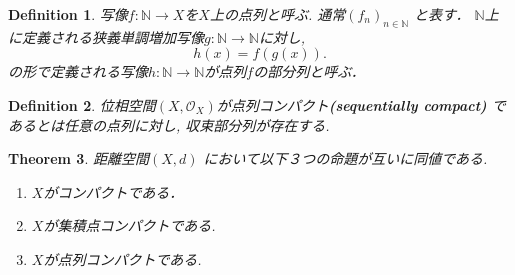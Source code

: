 \documentclass[lualatex]{ltjsbook}
\newtheorem{theorem}{Theorem}[chapter]
\newtheorem{definition}[theorem]{Definition}
\theoremstyle{remark}
\theoremstyle{plain}
\begin{document}
\begin{definition}
	 写像$f: \mathbb{N} \to X$を$X$上の点列と呼ぶ. 
	 通常$(f_n)_{n \in \mathbb{N}}$ と表す．
	 $\mathbb{N}$上に定義される狭義単調増加写像$g: \mathbb{N} \to  \mathbb{N}$に対し,  
	 \[
	 h(x) = f(g(x))
	 .\] 
	 の形で定義される写像$h: \mathbb{N} \to \mathbb{N}$が点列$f$の部分列と呼ぶ．
\end{definition}

\begin{definition}
	位相空間$\left( X ,  \mathcal{O}_{X} \right)$が点列コンパクト\textbf{(sequentially compact)}
	であるとは任意の点列に対し,  収束部分列が存在する.
\end{definition}

\begin{theorem}
	距離空間$\left( X , d \right)$ において以下３つの命題が互いに同値である.
	\begin{enumerate}
		\item $X$がコンパクトである．
		\item  $X$が集積点コンパクトである.
		\item $X$が点列コンパクトである.
	\end{enumerate}
\end{theorem}
\end{document}
